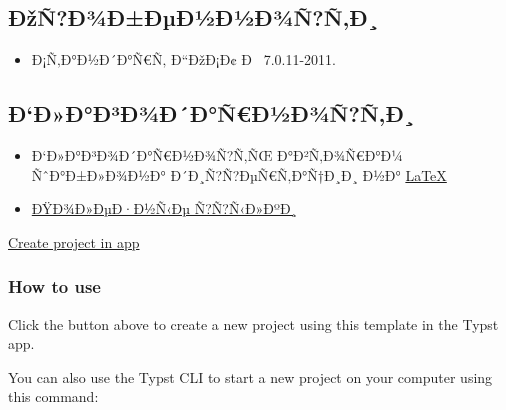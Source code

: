 \begin{Shaded}
\begin{Highlighting}[]
\end{Highlighting}
\end{Shaded}

\subsection{ÐžÑ?Ð¾Ð±ÐµÐ½Ð½Ð¾Ñ?Ñ‚Ð¸}\label{uxf0ux17euxf1uxf0uxbeuxf0uxf0uxb5uxf0uxbduxf0uxbduxf0uxbeuxf1uxf1uxf0}

\begin{itemize}
\tightlist
\item
  Ð¡Ñ‚Ð°Ð½Ð´Ð°Ñ€Ñ‚ Ð``ÐžÐ¡Ð¢ Ð~ 7.0.11-2011.
\end{itemize}

\subsection{Ð`Ð»Ð°Ð³Ð¾Ð´Ð°Ñ€Ð½Ð¾Ñ?Ñ‚Ð¸}\label{uxf0uxf0uxf0uxf0uxb3uxf0uxbeuxf0uxf0uxf1uxf0uxbduxf0uxbeuxf1uxf1uxf0}

\begin{itemize}
\item
  Ð`Ð»Ð°Ð³Ð¾Ð´Ð°Ñ€Ð½Ð¾Ñ?Ñ‚ÑŒ Ð°Ð²Ñ‚Ð¾Ñ€Ð°Ð¼ ÑˆÐ°Ð±Ð»Ð¾Ð½Ð°
  Ð´Ð¸Ñ?Ñ?ÐµÑ€Ñ‚Ð°Ñ†Ð¸Ð¸ Ð½Ð°
  \href{https://github.com/AndreyAkinshin/Russian-Phd-LaTeX-Dissertation-Template}{LaTeX}
\item
  \href{https://github.com/AndreyAkinshin/Russian-Phd-LaTeX-Dissertation-Template/wiki/Links\#\%D0\%BF\%D1\%80\%D0\%BE\%D1\%87\%D0\%B8\%D0\%B5-\%D1\%80\%D0\%B5\%D0\%BF\%D0\%BE\%D0\%B7\%D0\%B8\%D1\%82\%D0\%BE\%D1\%80\%D0\%B8\%D0\%B8-\%D1\%81-\%D0\%BF\%D0\%BE\%D0\%BB\%D0\%B5\%D0\%B7\%D0\%BD\%D1\%8B\%D0\%BC\%D0\%B8-\%D0\%BF\%D1\%80\%D0\%B8\%D0\%BC\%D0\%B5\%D1\%80\%D0\%B0\%D0\%BC\%D0\%B8}{ÐŸÐ¾Ð»ÐµÐ·Ð½Ñ‹Ðµ
  Ñ?Ñ?Ñ‹Ð»ÐºÐ¸}
\end{itemize}

\href{/app?template=modern-russian-dissertation&version=0.0.1}{Create
project in app}

\subsubsection{How to use}\label{how-to-use}

Click the button above to create a new project using this template in
the Typst app.

You can also use the Typst CLI to start a new project on your computer
using this command:

